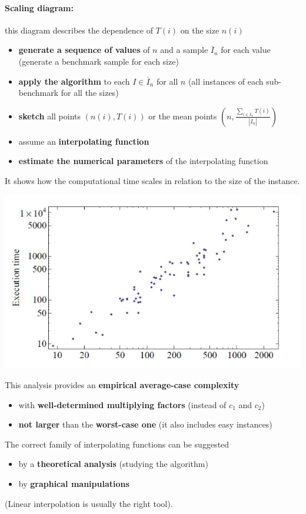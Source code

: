 \documentclass[11pt]{article}
\begin{document}
	\newpage
	
	\paragraph{Scaling diagram:} this diagram describes the dependence of $T (i )$ on the size $n (i )$
	\begin{itemize}
		\item \textbf{generate a sequence of values} of $n$ and a sample $\overline{I}_n$ for each value (generate a benchmark sample for each size)
		\item \textbf{apply the algorithm} to each $I \in \overline{I}_n$ for all $n$ (all instances of each sub-benchmark for all the sizes)
		\item \textbf{sketch} all points $(n (i ) , T (i ))$ or the mean points $\left(n, \frac{\sum_{i \in \overline{I}_n} T(i)}{|\overline{I}_n|}\right)$ 
		\item assume an \textbf{interpolating function}
		\item \textbf{estimate the numerical parameters} of the interpolating function
	\end{itemize}
	It shows how the computational time scales in relation to the size of the instance.
	\begin{center}
		\includegraphics[width=0.7\columnwidth]{img/SD1}
	\end{center}
	This analysis provides an \textbf{empirical average-case complexity}
	\begin{itemize}
		\item with \textbf{well-determined multiplying factors} (instead of $c_1$ and $c_2$)
		\item \textbf{not larger} than the \textbf{worst-case one} (it also includes easy instances)
	\end{itemize}
	
	\newpage
	
	The correct family of interpolating functions can be suggested
	\begin{itemize}
		\item by a \textbf{theoretical analysis} (studying the algorithm)
		\item by \textbf{graphical manipulations}
	\end{itemize}
	(Linear interpolation is usually the right tool).\\
	
\end{document}
